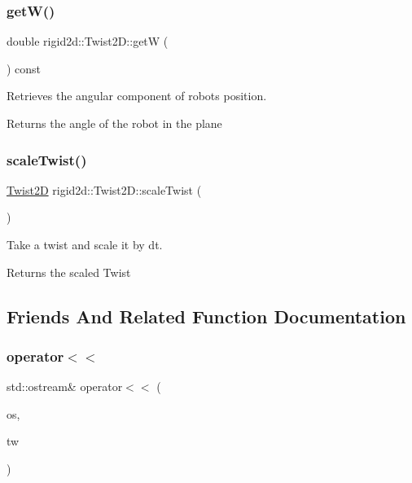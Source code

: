 \subsubsection{\texorpdfstring{get\+W()}{getW()}}
{\footnotesize\ttfamily double rigid2d\+::\+Twist2\+D\+::getW (\begin{DoxyParamCaption}{ }\end{DoxyParamCaption}) const}



Retrieves the angular component of robot\textquotesingle{}s position. 

\begin{DoxyReturn}{Returns}
the angle of the robot in the plane 
\end{DoxyReturn}
\mbox{\label{classrigid2d_1_1Twist2D_a777041352439c853197d2bca414ec4cf}} 
\subsubsection{\texorpdfstring{scale\+Twist()}{scaleTwist()}}
{\footnotesize\ttfamily \hyperlink{classrigid2d_1_1Twist2D}{Twist2D} rigid2d\+::\+Twist2\+D\+::scale\+Twist (\begin{DoxyParamCaption}\item[{double}]{ }\end{DoxyParamCaption})}



Take a twist and scale it by dt. 

\begin{DoxyReturn}{Returns}
the scaled Twist 
\end{DoxyReturn}


\subsection{Friends And Related Function Documentation}
\mbox{\label{classrigid2d_1_1Twist2D_aa73bc548f9e2f87b66c08cd96443e792}} 
\subsubsection{\texorpdfstring{operator$<$$<$}{operator<<}}
{\footnotesize\ttfamily std\+::ostream\& operator$<$$<$ (\begin{DoxyParamCaption}\item[{std\+::ostream \&}]{os,  }\item[{const \hyperlink{classrigid2d_1_1Twist2D}{Twist2D} \&}]{tw }\end{DoxyParamCaption})\hspace{0.3cm}{\ttfamily [friend]}}



